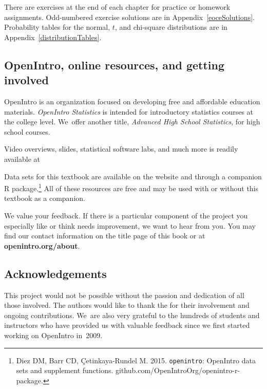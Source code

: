 There are exercises at the end of each chapter for practice
or homework assignments.
Odd-numbered exercise solutions are in
Appendix~\ref{eoceSolutions}.
Probability tables for the normal, $t$,
and chi-square distributions are in
Appendix~\ref{distributionTables}.

\subsection*{OpenIntro, online resources, and getting involved}

OpenIntro is an organization focused on developing
free and affordable education materials.
\emph{OpenIntro Statistics} is intended for introductory
statistics courses at the college level.
We~offer another title,
    {\emph{Advanced High School Statistics}},
for high school courses.

Video overviews, slides, statistical software labs,
and much more is readily available at\\[-2mm]
\begin{center}
\end{center}
Data sets for this textbook are available on the website
and through a companion R package.\footnote{Diez DM,
    Barr CD, \c{C}etinkaya-Rundel M. 2015.
    \texttt{openintro}: OpenIntro data sets and supplement
    functions.
        {github.com/OpenIntroOrg/openintro-r-package}.}
All of these resources are free and may be used with
or without this textbook as a companion.

We value your feedback.
If there is a particular component of the project you
especially like or think needs improvement,
we want to hear from you.
You may find our contact information on the title page
of this book or at
    {\color{black}\textbf{openintro.org/about}}.

\subsection*{Acknowledgements}

This project would not be possible without the passion
and dedication of all those involved.
The authors would like to thank the
for their involvement and ongoing contributions.
We~are also very grateful to the hundreds of students
and instructors who have provided us with valuable feedback
since we first started working on OpenIntro in~2009.

